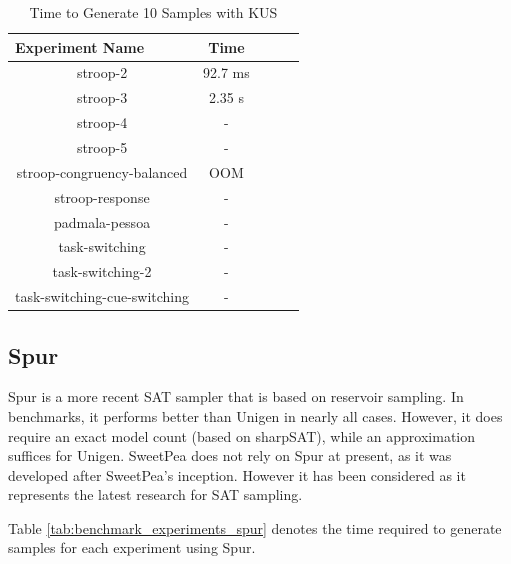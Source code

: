 \begin{table}[t]
  \centering
  \caption{Time to Generate 10 Samples with KUS}
\begin{tabular}{|c|c|c|c|c|}
\hline
\multicolumn{1}{|l|}{Experiment Name} & Time        \\ \hline
stroop-2                              & 92.7 ms     \\ \hline
stroop-3                              & 2.35 s      \\ \hline
stroop-4                              & -           \\ \hline
stroop-5                              & -           \\ \hline
stroop-congruency-balanced            & OOM         \\ \hline  %
stroop-response                       & -           \\ \hline
padmala-pessoa                        & -           \\ \hline
task-switching                        & -           \\ \hline
task-switching-2                      & -           \\ \hline
task-switching-cue-switching          & -           \\ \hline
\end{tabular}
\label{tab:benchmark_experiments_kus}%
\end{table}




\subsection{Spur}

Spur \cite{spur} is a more recent SAT sampler that is based on reservoir sampling. In benchmarks, it performs better than Unigen in nearly all cases. However, it does require an exact model count (based on sharpSAT), while an approximation suffices for Unigen. SweetPea does not rely on Spur at present, as it was developed after SweetPea's inception. However it has been considered as it represents the latest research for SAT sampling.

Table \ref{tab:benchmark_experiments_spur} denotes the time required to generate samples for each experiment using Spur.




